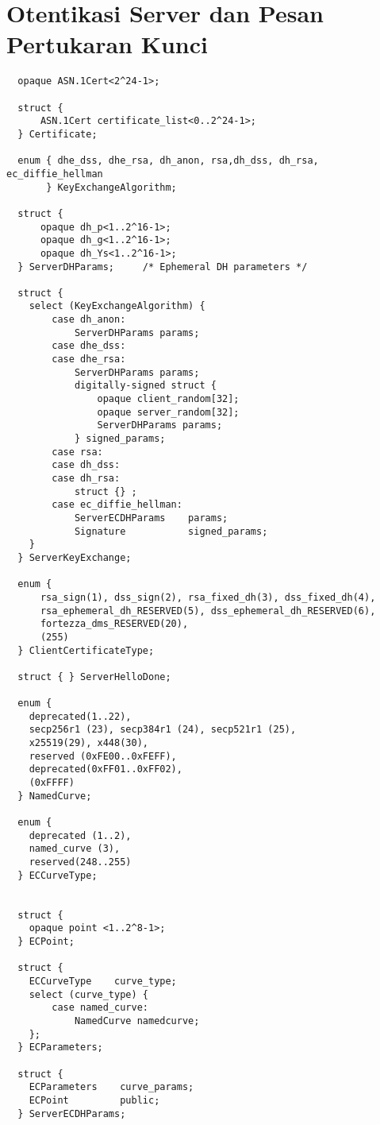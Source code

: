 \section{Otentikasi Server dan Pesan Pertukaran Kunci}

\begin{verbatim}
  opaque ASN.1Cert<2^24-1>;

  struct {
      ASN.1Cert certificate_list<0..2^24-1>;
  } Certificate;

  enum { dhe_dss, dhe_rsa, dh_anon, rsa,dh_dss, dh_rsa, ec_diffie_hellman
       } KeyExchangeAlgorithm;

  struct {
      opaque dh_p<1..2^16-1>;
      opaque dh_g<1..2^16-1>;
      opaque dh_Ys<1..2^16-1>;
  } ServerDHParams;     /* Ephemeral DH parameters */

  struct {
    select (KeyExchangeAlgorithm) {
        case dh_anon:
            ServerDHParams params;
        case dhe_dss:
        case dhe_rsa:
            ServerDHParams params;
            digitally-signed struct {
                opaque client_random[32];
                opaque server_random[32];
                ServerDHParams params;
            } signed_params;
        case rsa:
        case dh_dss:
        case dh_rsa:
            struct {} ;
        case ec_diffie_hellman:
            ServerECDHParams    params;
            Signature           signed_params;
    }
  } ServerKeyExchange;

  enum {
      rsa_sign(1), dss_sign(2), rsa_fixed_dh(3), dss_fixed_dh(4),
      rsa_ephemeral_dh_RESERVED(5), dss_ephemeral_dh_RESERVED(6),
      fortezza_dms_RESERVED(20),
      (255)
  } ClientCertificateType;

  struct { } ServerHelloDone;

  enum {
    deprecated(1..22),
    secp256r1 (23), secp384r1 (24), secp521r1 (25),
    x25519(29), x448(30),
    reserved (0xFE00..0xFEFF),
    deprecated(0xFF01..0xFF02),
    (0xFFFF)
  } NamedCurve;

  enum {
    deprecated (1..2),
    named_curve (3),
    reserved(248..255)
  } ECCurveType;


  struct {
    opaque point <1..2^8-1>;
  } ECPoint;

  struct {
    ECCurveType    curve_type;
    select (curve_type) {
        case named_curve:
            NamedCurve namedcurve;
    };
  } ECParameters;

  struct {
    ECParameters    curve_params;
    ECPoint         public;
  } ServerECDHParams;


\end{verbatim}
